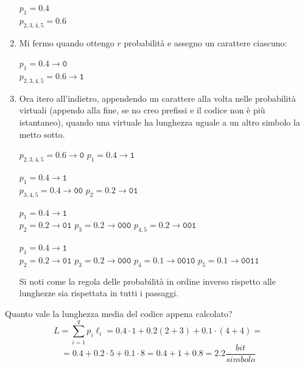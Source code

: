 \begin{enumerate}
\begin{multicols}{3}
	\begin{center}
		$p_1 = 0.4$\\
		$p_{2,3,4,5} = 0.6$
	\end{center}
\end{multicols}
\item Mi fermo quando ottengo $r$ probabilità e assegno un carattere ciascuno:
\begin{center}
	$p_1 = 0.4 \rightarrow \texttt{0}$\\
	$p_{2,3,4,5} = 0.6 \rightarrow \texttt{1}$
\end{center}
\item Ora itero all'indietro, appendendo un carattere alla volta nelle probabilità virtuali (appendo alla fine, se no creo prefissi e il codice non è più istantaneo), quando una virtuale ha lunghezza uguale a un altro simbolo la metto sotto.
\small{
\begin{multicols}{4}
	\begin{center}
		$p_{2,3,4,5} = 0.6 \rightarrow \texttt{0}$
		$p_1 = 0.4 \rightarrow \texttt{1}$\\
	\end{center}
	
	\columnbreak
	
	\begin{center}
		$p_1 = 0.4 \rightarrow \texttt{1}$\\
		$p_{3,4,5} = 0.4 \rightarrow \texttt{00}$
		$p_{2} = 0.2 \rightarrow \texttt{01}$
	\end{center}  
	
	\columnbreak
	
	\begin{center}
		$p_1 = 0.4 \rightarrow \texttt{1}$\\
		$p_{2} = 0.2 \rightarrow \texttt{01}$
		$p_{3} = 0.2 \rightarrow \texttt{000}$
		$p_{4,5} = 0.2 \rightarrow \texttt{001}$
	\end{center}

\columnbreak

\begin{center}
	$p_1 = 0.4 \rightarrow \texttt{1}$\\
	$p_{2} = 0.2 \rightarrow \texttt{01}$
	$p_{3} = 0.2 \rightarrow \texttt{000}$
	$p_{4} = 0.1 \rightarrow \texttt{0010}$
	$p_{5} = 0.1 \rightarrow \texttt{0011}$
\end{center}

\end{multicols}
}
\footnotesize{
Si noti come la regola delle probabilità in ordine inverso rispetto alle lunghezze sia rispettata in tutti i passaggi.
}

\end{enumerate}
Quanto vale la lunghezza media del codice appena calcolato?
\begin{equation*}
L = \sum_{i=1}^qp_i\ell_i = 0.4 \cdot 1 + 0.2 (2+3) + 0.1 \cdot (4+4) = 
\end{equation*}
\begin{equation*}
= 0.4 + 0.2 \cdot 5 + 0.1 \cdot 8 = 0.4 +1+0.8 = 2.2\frac{bit}{simbolo}
\end{equation*}

